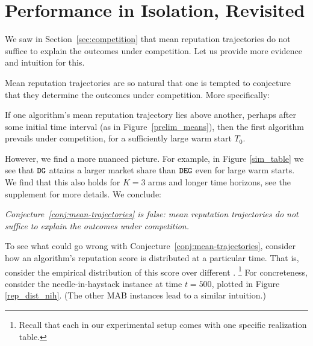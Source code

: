 \documentclass[../competing_bandits_with_appendix.tex]{subfiles}
\begin{document}
\section{Performance in Isolation, Revisited}\label{sec:revisited}

We saw in Section~\ref{sec:competition} that mean reputation trajectories do not suffice to explain the outcomes under competition. Let us provide more evidence and intuition for this.

Mean reputation trajectories are so natural that one is tempted to conjecture that they determine the outcomes under competition. More specifically:
\begin{conjecture}\label{conj:mean-trajectories}
If one algorithm's mean reputation trajectory lies above another, perhaps after some initial time interval (\eg as in Figure~\ref{prelim_means}), then the first algorithm prevails under competition, for a sufficiently large warm start $T_0$.
\end{conjecture}

However, we find a more nuanced picture. For example, in Figure \ref{sim_table} we see that $\mathtt{DG}$ attains a larger market share than $\mathtt{DEG}$ even for large warm starts. We find that this also holds for $K = 3$ arms and longer time horizons, see the supplement for more details. We conclude:


\begin{finding}
\textit{
Conjecture~\ref{conj:mean-trajectories} is false: mean reputation trajectories do not suffice to explain the outcomes under competition.}
\end{finding}

To see what could go wrong with Conjecture~\ref{conj:mean-trajectories}, consider how an algorithm's reputation score is distributed at a particular time. That is, consider the empirical distribution of this score over different \MRVs.%
\footnote{Recall that each \MRV in our experimental setup comes with one specific realization table.} For concreteness, consider the needle-in-haystack instance at time $t=500$, plotted in Figure \ref{rep_dist_nih}. (The other MAB instances lead to a similar intuition.)
\end{document}
